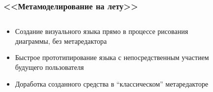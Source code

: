 \documentclass[14pt]{beamer}
\begin{document}
\begin{frame}
    \frametitle{<<Метамоделирование на лету>>}
    \begin{columns}[onlytextwidth]
       \begin{column}{0.6\textwidth}
         \begin{itemize}
             \item Создание визуального языка прямо в процессе рисования диаграммы, 
                 без метаредактора
             \item Быстрое прототипирование языка с непосредственным участием будущего пользователя
             \item Доработка созданного средства в ``классическом'' метаредакторе
         \end{itemize}
       \end{column}
       \begin{column}{0.3\textwidth}
            \begin{figure}
            	\begin{center}
            		\raisebox{0.4cm}{
}
\end{center}
\end{figure}
\end{column}
\end{columns}
\end{frame}
\end{document}
